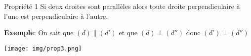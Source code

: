 \documentclass[12pt,a4paper]{article}
\begin{document}
\begin{definition}{Propriété 1}
Si deux droites sont parallèles alors toute droite perpendiculaire à l'une est perpendiculaire à l'autre.
\end{definition}
\begin{minipage}{0.7\textwidth}
\textbf{Exemple}: On sait que $(d)\parallel(d')$ et que $(d)\perp(d'')$ donc $(d')\perp (d'')$
\end{minipage}
\begin{minipage}{0.3\textwidth}
\texttt{[image: img/prop3.png]} 
\end{minipage}
\end{document}
